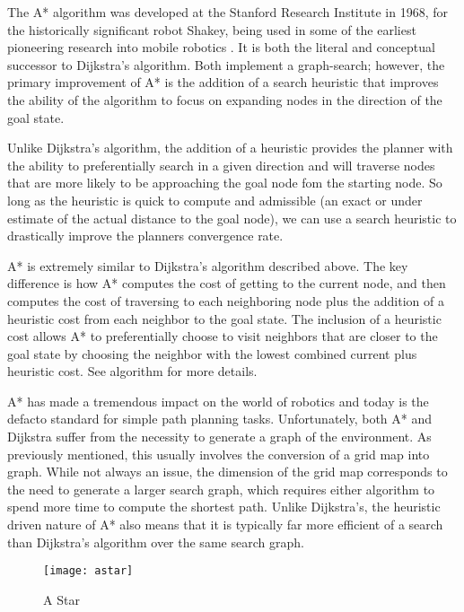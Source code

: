 The A* algorithm was developed at the Stanford Research Institute in 1968, for the historically significant robot Shakey, being used in some of the earliest pioneering research into mobile robotics \cite{Hart1968}. It is both the literal and conceptual successor to Dijkstra's algorithm. Both implement a graph-search; however, the primary improvement of A* is the addition of a search heuristic that improves the ability of the algorithm to focus on expanding nodes in the direction of the goal state.  

Unlike Dijkstra's algorithm, the addition of a heuristic provides the planner with the ability to preferentially search in a given direction and will traverse nodes that are more likely to be approaching the goal node fom the starting node. So long as the heuristic is quick to compute and admissible (an exact or under estimate of the actual distance to the goal node), we can use a search heuristic to drastically improve the planners convergence rate.

A* is extremely similar to Dijkstra's algorithm described above. The key difference is how A* computes the cost of getting to the current node, and then computes the cost of traversing to each neighboring node plus the addition of a heuristic cost from each neighbor to the goal state. The inclusion of a heuristic cost allows A* to preferentially choose to visit neighbors that are closer to the goal state by choosing the neighbor with the lowest combined current plus heuristic cost. See algorithm for more details.



A* has made a tremendous impact on the world of robotics and today is the defacto standard for simple path planning tasks. Unfortunately, both A* and Dijkstra suffer from the necessity to generate a graph of the environment. As previously mentioned, this usually involves the conversion of a grid map into graph. While not always an issue, the dimension of the grid map corresponds to the need to generate a larger search graph, which requires either algorithm to spend more time to compute the shortest path. Unlike Dijkstra's, the heuristic driven nature of A* also means that it is typically far more efficient of a search than Dijkstra's algorithm over the same search graph. 


\begin{figure}[h]
    \texttt{[image: astar]}
    \centering
    \label{fig:Astar}
    \caption{A Star}
  \end{figure}

